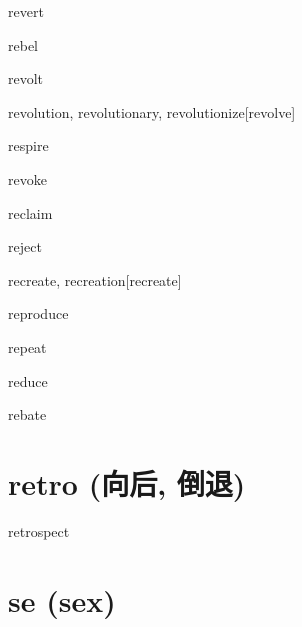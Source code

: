 \begin{RefWord}{revert}
\end{RefWord}

\begin{RefWord}{rebel}
\end{RefWord}

\begin{RefWord}{revolt}
\end{RefWord}

\begin{RefWord}{revolution, revolutionary, revolutionize}[revolve]
\end{RefWord}

\begin{RefWord}{respire}
\end{RefWord}

\begin{RefWord}{revoke}
\end{RefWord}

\begin{RefWord}{reclaim}
\end{RefWord}

\begin{RefWord}{reject}
\end{RefWord}

\begin{RefWord}{recreate, recreation}[recreate]
\end{RefWord}

\begin{RefWord}{reproduce}
\end{RefWord}

\begin{RefWord}{repeat}
\end{RefWord}

\begin{RefWord}{reduce}
\end{RefWord}

\begin{RefWord}{rebate}
\end{RefWord}

\section{retro (向后, 倒退)}
\begin{RefWord}{retrospect}
\end{RefWord}

\section{se (sex)}

